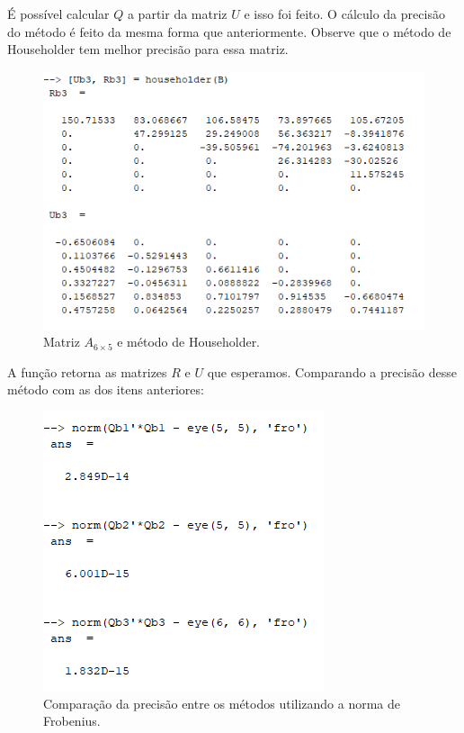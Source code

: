\documentclass[11pt]{article}
\begin{document}
\begin{enumerate}
            É possível calcular $Q$ a partir da matriz $U$ e isso foi feito. O cálculo da precisão do método é feito da mesma forma que anteriormente. Observe que o método de Householder tem melhor precisão para essa matriz.
        
            \begin{figure}[H]
                \centering
                \includegraphics[]{3-3}
                \caption{Matriz $A_{6\times5}$ e método de Householder.}
            \end{figure}
        
            A função retorna as matrizes $R$ e $U$ que esperamos. Comparando a precisão desse método com as dos itens anteriores:
        
            \begin{figure}[H]
                \centering
                \includegraphics[]{3-4}
                \caption{Comparação da precisão entre os métodos utilizando a norma de Frobenius.}
            \end{figure}
            

\end{enumerate}
\end{document}
